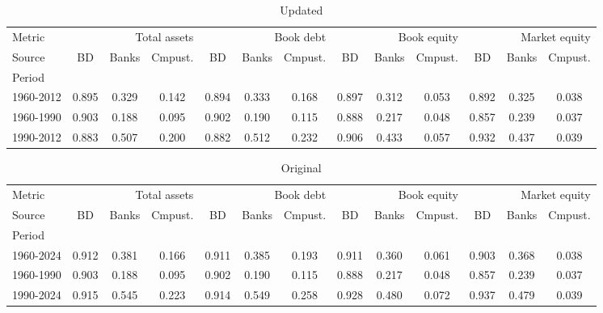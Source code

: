 \documentclass{article}
\begin{document}
    \begin{table}[htbp]
      \centering
      \caption{Updated}
      \label{tab:Table 2}
      \small
      \begin{tabular}{lcccccccccccc}
\toprule
Metric & \multicolumn{3}{r}{Total assets} & \multicolumn{3}{r}{Book debt} & \multicolumn{3}{r}{Book equity} & \multicolumn{3}{r}{Market equity} \\
Source & BD & Banks & Cmpust. & BD & Banks & Cmpust. & BD & Banks & Cmpust. & BD & Banks & Cmpust. \\
Period &  &  &  &  &  &  &  &  &  &  &  &  \\
\midrule
1960-2012 & 0.895 & 0.329 & 0.142 & 0.894 & 0.333 & 0.168 & 0.897 & 0.312 & 0.053 & 0.892 & 0.325 & 0.038 \\
1960-1990 & 0.903 & 0.188 & 0.095 & 0.902 & 0.190 & 0.115 & 0.888 & 0.217 & 0.048 & 0.857 & 0.239 & 0.037 \\
1990-2012 & 0.883 & 0.507 & 0.200 & 0.882 & 0.512 & 0.232 & 0.906 & 0.433 & 0.057 & 0.932 & 0.437 & 0.039 \\
\bottomrule
\end{tabular}

    \end{table}
    

    \begin{table}[htbp]
      \centering
      \caption{Original}
      \label{tab:Table 2}
      \small
      \begin{tabular}{lcccccccccccc}
\toprule
Metric & \multicolumn{3}{r}{Total assets} & \multicolumn{3}{r}{Book debt} & \multicolumn{3}{r}{Book equity} & \multicolumn{3}{r}{Market equity} \\
Source & BD & Banks & Cmpust. & BD & Banks & Cmpust. & BD & Banks & Cmpust. & BD & Banks & Cmpust. \\
Period &  &  &  &  &  &  &  &  &  &  &  &  \\
\midrule
1960-2024 & 0.912 & 0.381 & 0.166 & 0.911 & 0.385 & 0.193 & 0.911 & 0.360 & 0.061 & 0.903 & 0.368 & 0.038 \\
1960-1990 & 0.903 & 0.188 & 0.095 & 0.902 & 0.190 & 0.115 & 0.888 & 0.217 & 0.048 & 0.857 & 0.239 & 0.037 \\
1990-2024 & 0.915 & 0.545 & 0.223 & 0.914 & 0.549 & 0.258 & 0.928 & 0.480 & 0.072 & 0.937 & 0.479 & 0.039 \\
\bottomrule
\end{tabular}

    \end{table}
    
\end{document}
